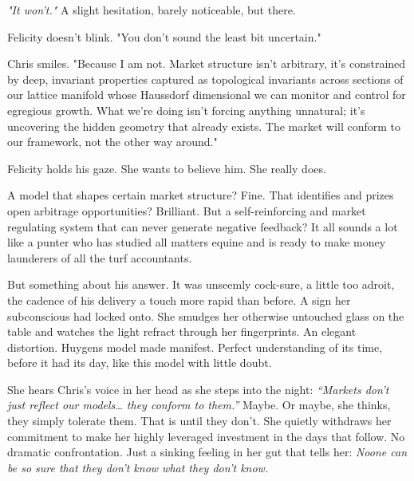 \smallskip

\textit{"It won’t."} A slight hesitation, barely noticeable, but there.

\smallskip

Felicity doesn’t blink. "You don't sound the least bit uncertain."

\smallskip

Chris smiles. "Because I am not. Market structure isn’t arbitrary, it’s constrained by deep, invariant properties captured as topological invariants across sections of our lattice manifold whose Haussdorf dimensional we can monitor and control for egregious growth. What we’re doing isn’t forcing anything unnatural; it’s uncovering the hidden geometry that already exists. The market will conform to our framework, not the other way around."

\smallskip

Felicity holds his gaze. She wants to believe him. She really does.

\smallskip

A model that shapes certain market structure? Fine. That identifies and prizes open arbitrage opportunities? Brilliant. But a self-reinforcing and market regulating system that can never generate negative feedback? It all sounds a lot like a punter who has studied all matters equine and is ready to make money launderers of all the turf accountants. 

\smallskip

But something about his answer. It was unseemly cock-sure, a little too adroit, the cadence of his delivery a touch more rapid than before. A sign her subconscious had locked onto. She smudges her otherwise untouched glass on the table and watches the light refract through her fingerprints. An elegant distortion. Huygens model made manifest. Perfect understanding of its time, before it had its day, like this model with little doubt.

\smallskip

She hears Chris’s voice in her head as she steps into the night: \textit{“Markets don’t just reflect our models… they conform to them.”} Maybe.  Or maybe, she thinks, they simply tolerate them. That is until they don’t. She quietly withdraws her commitment to make her highly leveraged investment in the days that follow. No dramatic confrontation. Just a sinking feeling in her gut that tells her:
\textit{Noone can be so sure that they don’t know what they don’t know.}


